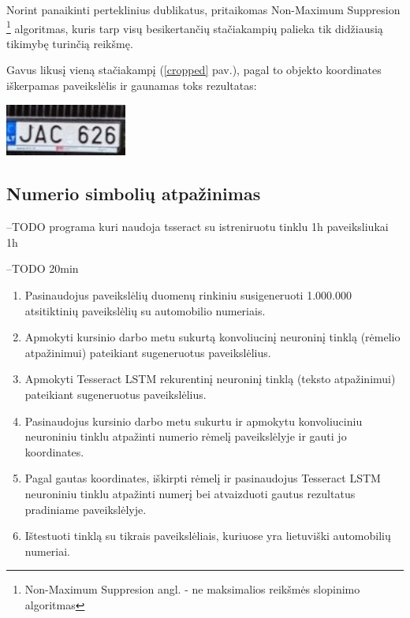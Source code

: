 \documentclass{VUMIFInfBakalaurinis}
\begin{document}
Norint panaikinti perteklinius dublikatus, pritaikomas 
Non-Maximum Suppresion \footnote{Non-Maximum Suppresion angl. - ne maksimalios reikšmės slopinimo algoritmas} algoritmas, kuris
tarp visų besikertančių stačiakampių palieka tik didžiausią tikimybę turinčią reikšmę\cite{girshick2014rich}.

Gavus likusį vieną stačiakampį (\ref{cropped} pav.), pagal to objekto koordinates iškerpamas paveikslėlis ir gaunamas toks rezultatas:

\begin{minipage}{\linewidth}
  \centering
  \includegraphics[width=4cm]{cropped_4.jpg}
  \label{cropped}
\end{minipage}



\subsection{Numerio simbolių atpažinimas}
--TODO
programa kuri naudoja tsseract su istreniruotu tinklu 1h
paveiksliukai 1h


\pagebreak
{}
--TODO 20min
\begin{enumerate}
  \item Pasinaudojus paveikslėlių duomenų rinkiniu susigeneruoti 1.000.000 atsitiktinių paveikslėlių su automobilio numeriais.
  \item Apmokyti kursinio darbo metu sukurtą konvoliucinį neuroninį tinklą (rėmelio atpažinimui) pateikiant sugeneruotus paveikslėlius.
  \item Apmokyti Tesseract LSTM rekurentinį neuroninį tinklą (teksto atpažinimui) pateikiant sugeneruotus paveikslėlius.
  \item Pasinaudojus kursinio darbo metu sukurtu ir apmokytu konvoliuciniu neuroniniu tinklu atpažinti numerio rėmelį paveikslėlyje ir gauti jo koordinates.
  \item Pagal gautas koordinates, iškirpti rėmelį ir pasinaudojus Tesseract LSTM neuroniniu tinklu atpažinti numerį bei atvaizduoti gautus rezultatus pradiniame paveikslėlyje.
  \item Ištestuoti tinklą su tikrais paveikslėliais, kuriuose yra lietuviški automobilių numeriai.
\end{enumerate}
\end{document}
